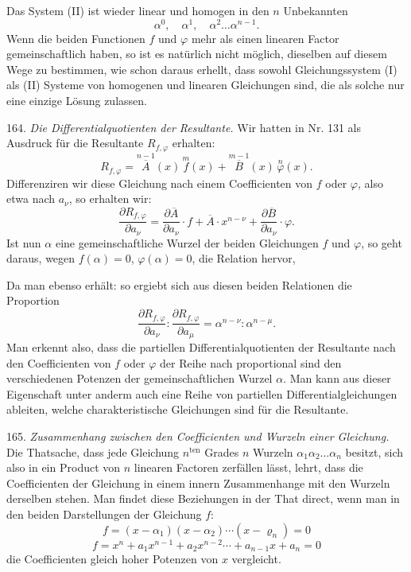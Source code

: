 Das System (II) ist wieder linear und homogen in den $n$ Unbekannten
\[
\alpha^0, \quad \alpha^1, \quad \alpha^2 \ldots \alpha^{n-1}.
\]
Wenn die beiden Functionen $f$ und $\varphi$ mehr als einen linearen Factor gemeinschaftlich haben, so ist es natürlich nicht möglich, dieselben auf diesem Wege zu bestimmen, wie schon daraus erhellt, dass sowohl Gleichungssystem (I) als (II) Systeme von homogenen und linearen Gleichungen sind, die als solche nur eine einzige Lösung zulassen.

164. \textit{Die Differentialquotienten der Resultante.} Wir hatten in Nr. 131 als Ausdruck für die Resultante $R_{f,\varphi}$ erhalten:
\[
R_{f,\varphi} = \overset{n-1}{\overline{A}}(x)\,\overset{m}{f}(x) + \overset{m-1}{\overline{B}}(x)\,\overset{n}{\varphi}(x).
\]
Differenziren wir diese Gleichung nach einem Coefficienten von $f$ oder $\varphi$, also etwa nach $a_\nu$, so erhalten wir:
\[
\frac{\partial R_{f,\varphi}}{\partial a_\nu} = \frac{\partial \overline{A}}{\partial a_\nu}\cdot f + \overline{A}\cdot x^{n-\nu} + \frac{\partial \overline{B}}{\partial a_\nu}\cdot \varphi.
\]
Ist nun $\alpha$ eine gemeinschaftliche Wurzel der beiden Gleichungen $f$ und $\varphi$, so geht daraus, wegen $f(\alpha)=0$, $\varphi(\alpha)=0$, die Relation hervor,


Da man ebenso erhält:
so ergiebt sich aus diesen beiden Relationen die Proportion
\[
\frac{\partial R_{f,\varphi}}{\partial a_\nu} : \frac{\partial R_{f,\varphi}}{\partial a_\mu} = \alpha^{n-\nu} : \alpha^{n-\mu}.
\]
Man erkennt also, dass die partiellen Differentialquotienten der Resultante nach den Coefficienten von $f$ oder $\varphi$ der Reihe nach proportional sind den verschiedenen Potenzen der gemeinschaftlichen Wurzel $\alpha$. Man kann aus dieser Eigenschaft unter anderm auch eine Reihe von partiellen Differentialgleichungen ableiten, welche charakteristische Gleichungen sind für die Resultante.

165. \textit{Zusammenhang zwischen den Coefficienten und Wurzeln einer Gleichung.} Die Thatsache, dass jede Gleichung $n^{\mathrm{ten}}$ Grades $n$ Wurzeln $\alpha_1 \alpha_2 \ldots \alpha_n$ besitzt, sich also in ein Product von $n$ linearen Factoren zerfällen lässt, lehrt, dass die Coefficienten der Gleichung in einem innern Zusammenhange mit den Wurzeln derselben stehen. Man findet diese Beziehungen in der That direct, wenn man in den beiden Darstellungen der Gleichung $f$:
\[
f = (x-\alpha_1)(x-\alpha_2)\cdots(x-\varrho_n) = 0 %
\]
\[
f = x^n + a_1 x^{n-1} + a_2 x^{n-2} \cdots + a_{n-1}x + a_n = 0
\]
die Coefficienten gleich hoher Potenzen von $x$ vergleicht.


